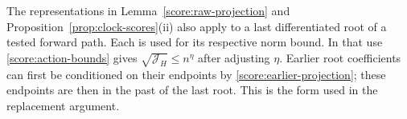 The representations in Lemma~\ref{score:raw-projection} and
Proposition~\ref{prop:clock-scores}(ii) also apply to a last differentiated
root of a tested forward path.  Each is used for its respective norm bound.
In that use \eqref{score:action-bounds} gives
$\sqrt{\mathcal J_H}\le n^\eta$ after adjusting $\eta$.  Earlier root
coefficients can first be conditioned on their endpoints by
\eqref{score:earlier-projection}; these endpoints are then in the past of
the last root.  This is the form used in the replacement argument.
